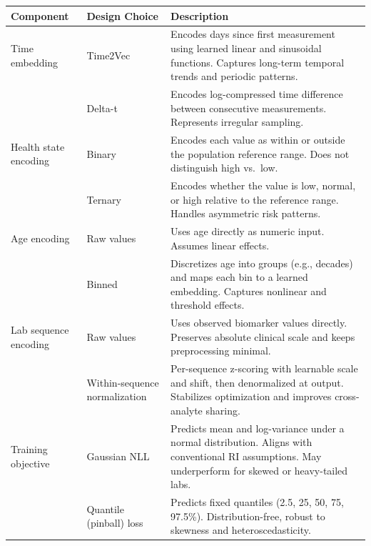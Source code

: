 \begin{table}[ht]
\centering
\small
\renewcommand{\arraystretch}{1.4}
\begin{tabular}{p{2.5cm}p{3cm}p{8.5cm}}
\toprule
Component & Design Choice & Description \\
\midrule
Time embedding
  & Time2Vec & Encodes days since first measurement using learned linear and sinusoidal functions. Captures long-term temporal trends and periodic patterns. \\
  & Delta-t & Encodes log-compressed time difference between consecutive measurements. Represents irregular sampling. \\
\midrule
Health state encoding
  & Binary & Encodes each value as within or outside the population reference range. Does not distinguish high vs.\ low. \\
  & Ternary & Encodes whether the value is low, normal, or high relative to the reference range. Handles asymmetric risk patterns. \\
\midrule
Age encoding
  & Raw values & Uses age directly as numeric input. Assumes linear effects. \\
  & Binned & Discretizes age into groups (e.g., decades) and maps each bin to a learned embedding. Captures nonlinear and threshold effects. \\
\midrule
Lab sequence encoding
  & Raw values & Uses observed biomarker values directly. Preserves absolute clinical scale and keeps preprocessing minimal. \\
  & Within-sequence normalization & Per-sequence z-scoring with learnable scale and shift, then denormalized at output. Stabilizes optimization and improves cross-analyte sharing. \\
\midrule
Training objective
  & Gaussian NLL & Predicts mean and log-variance under a normal distribution. Aligns with conventional RI assumptions. May underperform for skewed or heavy-tailed labs. \\
  & Quantile (pinball) loss & Predicts fixed quantiles (2.5, 25, 50, 75, 97.5\%). Distribution-free, robust to skewness and heteroscedasticity. \\
\bottomrule
\end{tabular}
\end{table}
